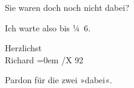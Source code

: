 \pstart
           {\pb}Sie waren doch noch nicht
               dabei?\pend
           
\pstart
           Ich warte also bis ¼ 6.\pend
           
\pstart
           Herzlichst{\\[\baselineskip]}\spacefill\mbox{Richard}\pend
           \leftskip=0em{}
/X 92\pend
           
\pstart
           Pardon für die zwei »dabei«.\pend
           \endnumbering{}  \newcommand{\dateiname}{L00127}\newcommand{\titel}{Richard Beer-Hofmann an Arthur Schnitzler, 14. 10. 1892}\newcommand{\editorInnen}{Martin Anton Müller und Gerd-Hermann Susen}
